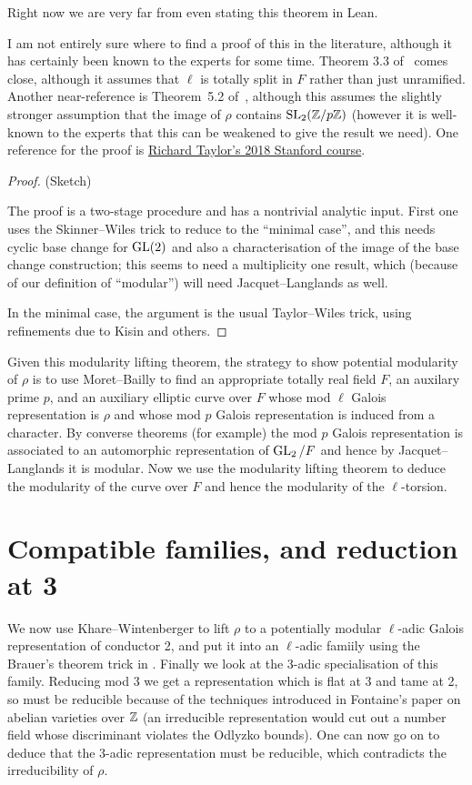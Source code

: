 Right now we are very far from even stating this theorem in Lean. 

I am not entirely sure where to find a proof of this in the literature, although it has certainly been known to the experts for some time. Theorem 3.3 of~\cite{taylor-mero-cont} comes close, although it assumes that $\ell$ is totally split in $F$ rather than just unramified. Another near-reference is Theorem~5.2 of~\cite{toby-modularity}, although this assumes
the slightly stronger assumption that the image of $\rho$ contains $\operatorname{SL}_2(\mathbb{Z}/p\mathbb{Z})$ (however it is well-known to the experts that this can be weakened to give the result we need). One reference for the proof is \href{https://math.berkeley.edu/~fengt/249A_2018.pdf}{Richard Taylor's 2018 Stanford course}. 

\begin{proof} (Sketch)

The proof is a two-stage procedure and has a nontrivial analytic input. First one uses the Skinner--Wiles trick to reduce to the ``minimal case'', and this needs cyclic base change for $\operatorname{GL}(2)$ and also a characterisation
of the image of the base change construction; this seems to need a multiplicity one result, which (because of our
definition of ``modular'') will need Jacquet--Langlands as well.

In the minimal case, the argument is the usual Taylor--Wiles trick, using refinements due to Kisin and others.
\end{proof}

Given this modularity lifting theorem, the strategy to show potential modularity of $\rho$ is to use Moret--Bailly to find an appropriate totally real field $F$, an auxilary prime $p$, and an auxiliary elliptic curve over $F$ whose mod $\ell$ Galois representation is $\rho$ and whose
mod $p$ Galois representation is induced from a character. By converse theorems (for example)
the mod $p$ Galois representation is associated to an automorphic representation of
$\operatorname{GL}_2/F$ and hence by Jacquet--Langlands it is modular. Now we use the
modularity lifting theorem to deduce the modularity of the curve over $F$ and hence
the modularity of the $\ell$-torsion. 

\section{Compatible families, and reduction at 3}

We now use Khare--Wintenberger to lift $\rho$ to a potentially modular $\ell$-adic
Galois representation of conductor 2, and put it into an $\ell$-adic famiily using
the Brauer's theorem trick in \cite{blggt}. Finally we look at the 3-adic specialisation
of this family. Reducing mod 3 we get a representation which is flat at 3 and tame at 2,
so must be reducible because
of the techniques introduced in Fontaine's paper on abelian varieties over $\mathbb{Z}$ (an irreducible
representation would cut out a number field whose discriminant violates the Odlyzko bounds).
One can now go on to deduce that the 3-adic representation must be reducible, which
contradicts the irreducibility of $\rho$.

